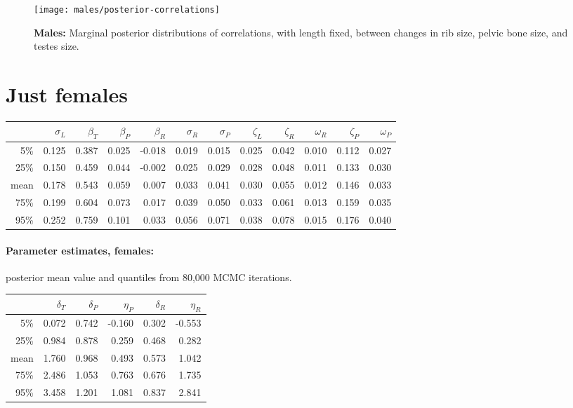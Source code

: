 \documentclass{article}
\begin{document}
\begin{figure}[ht]
  \begin{center}
    \texttt{[image: males/posterior-correlations]}
  \end{center}
  \caption{\textbf{Males:} Marginal posterior distributions of correlations, with length fixed,
  between changes in rib size, pelvic bone size, and testes size.
  \label{fig:posterior_cors}
  }
\end{figure}



\appendix

\section{Just females}

\begin{center}
\begin{tabular}{rrrrrrrrrrrr}
  \hline
 & $\sigma_L$ & $\beta_T$ & $\beta_P$ & $\beta_R$ & $\sigma_R$ & $\sigma_P$ & $\zeta_L$ & $\zeta_R$ & $\omega_R$ & $\zeta_P$ & $\omega_P$ \\ 
  \hline
5\% & 0.125 & 0.387 & 0.025 & -0.018 & 0.019 & 0.015 & 0.025 & 0.042 & 0.010 & 0.112 & 0.027 \\ 
  25\% & 0.150 & 0.459 & 0.044 & -0.002 & 0.025 & 0.029 & 0.028 & 0.048 & 0.011 & 0.133 & 0.030 \\ 
  mean & 0.178 & 0.543 & 0.059 & 0.007 & 0.033 & 0.041 & 0.030 & 0.055 & 0.012 & 0.146 & 0.033 \\ 
  75\% & 0.199 & 0.604 & 0.073 & 0.017 & 0.039 & 0.050 & 0.033 & 0.061 & 0.013 & 0.159 & 0.035 \\ 
  95\% & 0.252 & 0.759 & 0.101 & 0.033 & 0.056 & 0.071 & 0.038 & 0.078 & 0.015 & 0.176 & 0.040 \\ 
   \hline
\end{tabular}
\end{center}
\paragraph{Parameter estimates, females:} posterior mean value and quantiles from 80,000 MCMC iterations.

\begin{center}
\begin{tabular}{rrrrrr}
  \hline
 & $\delta_T$ & $\delta_P$ & $\eta_P$ & $\delta_R$ & $\eta_R$ \\ 
  \hline
5\% & 0.072 & 0.742 & -0.160 & 0.302 & -0.553 \\ 
  25\% & 0.984 & 0.878 & 0.259 & 0.468 & 0.282 \\ 
  mean & 1.760 & 0.968 & 0.493 & 0.573 & 1.042 \\ 
  75\% & 2.486 & 1.053 & 0.763 & 0.676 & 1.735 \\ 
  95\% & 3.458 & 1.201 & 1.081 & 0.837 & 2.841 \\ 
   \hline
\end{tabular}
\end{center}
\end{document}
